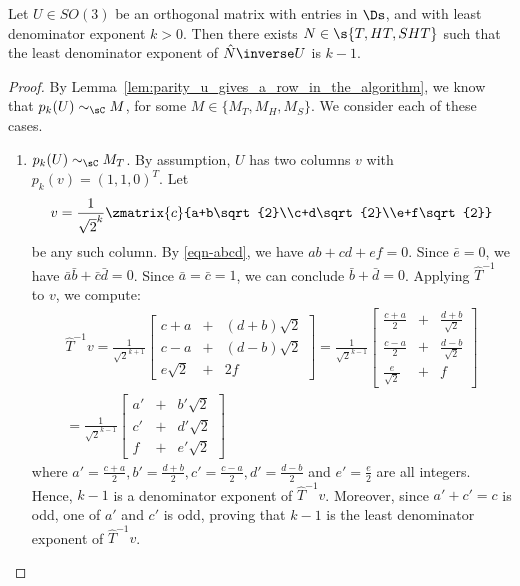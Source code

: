 \begin{lemma}\label{lem:applying_a_t_symbol_decreases_k}
  Let $U \in SO(3)$ be an orthogonal matrix with entries in $\Ds$, and with least denominator
  exponent $k > 0$. Then there exists $N\in\s{T, HT, SHT}$ such that the least denominator exponent
  of $\hat N\inverse U$ is $k-1$.
\end{lemma}

\begin{proof}
  By Lemma~\vref{lem:parity_u_gives_a_row_in_the_algorithm}, we know that $p_k(U)\sim_{\sC} M$, for
  some $M\in\{M_T, M_H, M_S\}$. We consider each of these cases.
  \begin{enumerate}
    \item \label{lemparitycase:applyt}$p_k(U) \sim_{\sC} M_T$.
      By assumption, $U$ has two columns $v$ with $p_k(v) = (1,1,0)^T$.
      Let
      \[ v =
      \frac{1}{\sqrt{2}^k}\zmatrix{c}{a+b\sqrt{2}\\c+d\sqrt{2}\\e+f\sqrt{2}}
      \]
      be any such column. By {\vref{eqn-abcd}},
      we have $ab+cd+ef = 0$. Since $\bar e = 0$, we have
      $\bar a \bar b+ \bar c \bar d = 0$. Since $\bar a = \bar c = 1$,
      we can conclude $\bar b+\bar d = 0$.
      Applying $\hat{T}^{-1}$ to $v$, we compute:
      \begin{multline*}
        \hat{T}^{-1}v = \frac{1}{\sqrt{2}^{k+1}}
        \begin{bmatrix}
          c+a &+& (d+b)\sqrt{2} \\
          c-a &+& (d-b)\sqrt{2} \\
          e\sqrt{2} &+& 2f
        \end{bmatrix}
        = \frac{1}{\sqrt{2}^{k-1}}
        \begin{bmatrix}
          \frac{c+a}{2} &+& \frac{d+b}{\sqrt{2}} \\
          \frac{c-a}{2} &+& \frac{d-b}{\sqrt{2}} \\
          \frac{e}{\sqrt{2}} &+& f
        \end{bmatrix}\\
        = \frac{1}{\sqrt{2}^{k-1}}
        \begin{bmatrix}
          a' &+& b'{\sqrt{2}} \\
          c' &+& d'{\sqrt{2}} \\
          f &+ & e'{\sqrt{2}}
        \end{bmatrix}
      \end{multline*}
      where $a' = \frac{c+a}{2}, b' = \frac{d+b}{2}, c' =
      \frac{c-a}{2}, d' = \frac{d-b}{2}$ and $e' = \frac{e}{2}$ are
      all integers. Hence, $k-1$ is a denominator exponent of
      $\hat{T}^{-1}v$. Moreover, since $a'+c'=c$ is odd, one of $a'$
      and $c'$ is odd, proving that $k-1$ is the least denominator
      exponent of $\hat{T}^{-1}v$.


\end{enumerate}
\end{proof}
